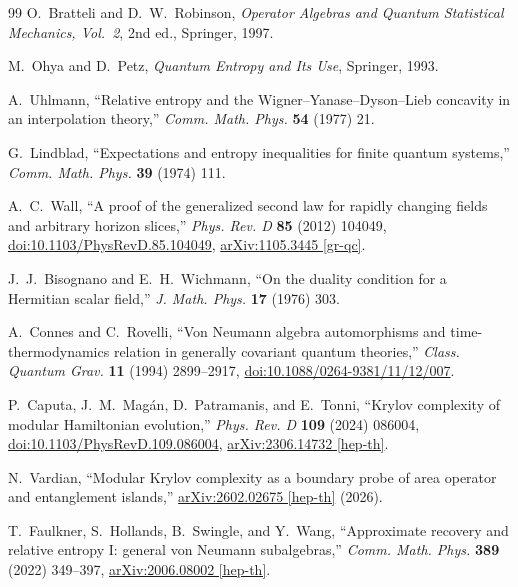 \documentclass[12pt,a4paper]{article}
\theoremstyle{definition}
\begin{document}
\begin{thebibliography}{99}
O.~Bratteli and D.~W.~Robinson,
\textit{Operator Algebras and Quantum Statistical Mechanics, Vol.~2},
2nd ed., Springer, 1997.

M.~Ohya and D.~Petz,
\textit{Quantum Entropy and Its Use},
Springer, 1993.

A.~Uhlmann,
``Relative entropy and the Wigner--Yanase--Dyson--Lieb concavity in an
interpolation theory,''
\textit{Comm. Math. Phys.} \textbf{54} (1977) 21.

G.~Lindblad,
``Expectations and entropy inequalities for finite quantum systems,''
\textit{Comm. Math. Phys.} \textbf{39} (1974) 111.

A.~C.~Wall,
``A proof of the generalized second law for rapidly changing fields and
arbitrary horizon slices,''
\textit{Phys. Rev. D} \textbf{85} (2012) 104049,
\href{https://doi.org/10.1103/PhysRevD.85.104049}{doi:10.1103/PhysRevD.85.104049},
\href{https://arxiv.org/abs/1105.3445}{arXiv:1105.3445 [gr-qc]}.

J.~J.~Bisognano and E.~H.~Wichmann,
``On the duality condition for a Hermitian scalar field,''
\textit{J. Math. Phys.} \textbf{17} (1976) 303.

A.~Connes and C.~Rovelli,
``Von Neumann algebra automorphisms and time-thermodynamics relation in
generally covariant quantum theories,''
\textit{Class. Quantum Grav.} \textbf{11} (1994) 2899--2917,
\href{https://doi.org/10.1088/0264-9381/11/12/007}{doi:10.1088/0264-9381/11/12/007}.

P.~Caputa, J.~M.~Mag\'{a}n, D.~Patramanis, and E.~Tonni,
``Krylov complexity of modular Hamiltonian evolution,''
\textit{Phys. Rev. D} \textbf{109} (2024) 086004,
\href{https://doi.org/10.1103/PhysRevD.109.086004}{doi:10.1103/PhysRevD.109.086004},
\href{https://arxiv.org/abs/2306.14732}{arXiv:2306.14732 [hep-th]}.

N.~Vardian,
``Modular Krylov complexity as a boundary probe of area operator and
entanglement islands,''
\href{https://arxiv.org/abs/2602.02675}{arXiv:2602.02675 [hep-th]} (2026).

T.~Faulkner, S.~Hollands, B.~Swingle, and Y.~Wang,
``Approximate recovery and relative entropy I: general von Neumann
subalgebras,''
\textit{Comm. Math. Phys.} \textbf{389} (2022) 349--397,
\href{https://arxiv.org/abs/2006.08002}{arXiv:2006.08002 [hep-th]}.


\end{thebibliography}
\end{document}
